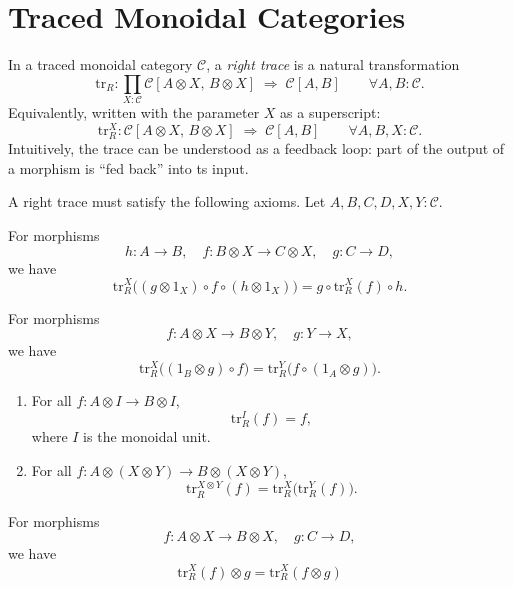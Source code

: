 \section{Traced Monoidal Categories}
\begin{definition}
	In a traced monoidal category $\mathcal{C}$, a \emph{right trace} is a natural transformation
	$$
		\mathrm{tr}_{R} : \prod_{X : \mathcal{C}} \mathcal{C}[A \otimes X,\, B \otimes X]
		\;\Rightarrow\; \mathcal{C}[A,B]
		\qquad \forall A,B : \mathcal{C}.
	$$
	Equivalently, written with the parameter $X$ as a superscript:
	$$
		\mathrm{tr}_{R}^{X} : \mathcal{C}[A \otimes X,\, B \otimes X]
		\;\Rightarrow\; \mathcal{C}[A,B]
		\qquad \forall A,B,X : \mathcal{C}.
	$$
	Intuitively, the trace can be understood as a feedback loop: part of the output of a morphism is ``fed back'' into ts input.
\end{definition}
A right trace must satisfy the following axioms.
Let $A,B,C,D,X,Y : \mathcal{C}$.
\begin{axiom}[Tightening]
	For morphisms
	$$
		h : A \to B,
		\quad f : B \otimes X \to C \otimes X,
		\quad g : C \to D,
	$$
	we have
	$$
		\mathrm{tr}_{R}^{X}\!\big( (g \otimes 1_X) \circ f \circ (h \otimes 1_X) \big)
		= g \circ \mathrm{tr}_{R}^{X}(f) \circ h.
	$$
\end{axiom}
\begin{axiom}[Sliding]
	For morphisms
	$$
		f : A \otimes X \to B \otimes Y,
		\quad g : Y \to X,
	$$
	we have
	$$
		\mathrm{tr}_{R}^{X}\!\big( (1_B \otimes g) \circ f \big)
		= \mathrm{tr}_{R}^{Y}\!\big( f \circ (1_A \otimes g) \big).
	$$
\end{axiom}
\begin{axiom}[Vanishing]
	\begin{enumerate}
		\item For all $f : A \otimes I \to B \otimes I$,
		      $$
			      \mathrm{tr}_{R}^{I}(f) = f,
		      $$
		      where $I$ is the monoidal unit.
		\item For all $f : A \otimes (X \otimes Y) \to B \otimes (X \otimes Y)$,
		      $$
			      \mathrm{tr}_{R}^{X \otimes Y}(f)
			      = \mathrm{tr}_{R}^{X}\!\big( \mathrm{tr}_{R}^{Y}(f) \big).
		      $$
	\end{enumerate}
\end{axiom}
\begin{axiom}[Superposing]
	For morphisms
	$$
		f : A \otimes X \to B \otimes X,
		\quad g : C \to D,
	$$
	we have
	$$
		\mathrm{tr}_{R}^{X}(f) \otimes g
		= \mathrm{tr}_{R}^{X}(f \otimes g)
	$$
\end{axiom}
\begin{definition}
\end{definition}
\begin{definition}
\end{definition}
\begin{definition}
\end{definition}

